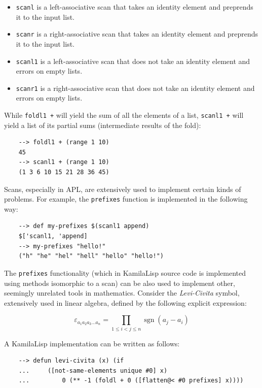 \begin{itemize}
    \item \verb|scanl| is a left-associative scan that takes an identity element and preprends it to the input list.
    \item \verb|scanr| is a right-associative scan that takes an identity element and preprends it to the input list.
    \item \verb|scanl1| is a left-associative scan that does not take an identity element and errors on empty lists.
    \item \verb|scanr1| is a right-associative scan that does not take an identity element and errors on empty lists.
\end{itemize}

While \verb|foldl1 +| will yield the sum of all the elements of a list, \verb|scanl1 +| will yield a list of its partial sums (intermediate results of the fold):

\begin{Verbatim}
    --> foldl1 + (range 1 10)
    45
    --> scanl1 + (range 1 10)
    (1 3 6 10 15 21 28 36 45)
\end{Verbatim}

Scans, especially in APL, are extensively used to implement certain kinds of problems. For example, the \verb|prefixes| function is implemented in the following way:

\begin{Verbatim}
    --> def my-prefixes $(scanl1 append)
    $['scanl1, 'append]
    --> my-prefixes "hello!"
    ("h" "he" "hel" "hell" "hello" "hello!")
\end{Verbatim}

The \verb|prefixes| functionality (which in KamilaLisp source code is implemented using methods isomorphic to a scan) can be also used to implement other, seemingly unrelated tools in mathematics. Consider the \textit{Levi-Civita} symbol, extensively used in linear algebra, defined by the following explicit expression:

$$
{\displaystyle \varepsilon _{a_{1}a_{2}a_{3}\ldots a_{n}}=\prod _{1\leq i<j\leq n}\operatorname {sgn}(a_{j}-a_{i})}
$$

A KamilaLisp implementation can be written as follows:

\begin{Verbatim}
    --> defun levi-civita (x) (if
    ...     ([not-same-elements unique #0] x)
    ...         0 (** -1 (foldl + 0 ([flatten@< #0 prefixes] x))))
\end{Verbatim}

